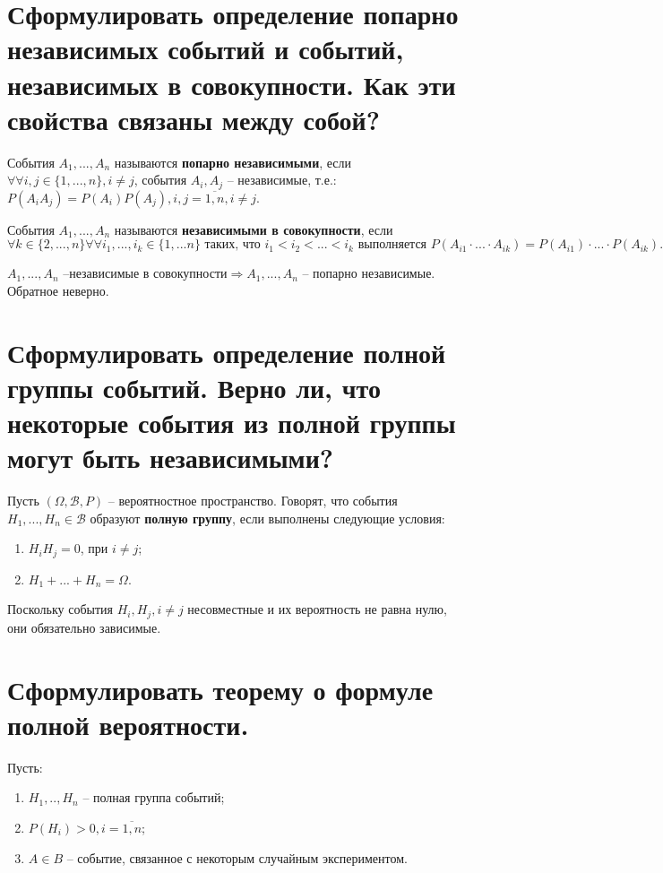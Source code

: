 \section{Сформулировать определение попарно независимых событий и событий, независимых в совокупности. Как эти свойства связаны между собой?}

События $A_1, ..., A_n$ называются \textbf{попарно независимыми}, если $\forall \forall i, j \in \{1, ..., n\}, i \neq j$, события $A_i, A_j$ -- независимые, т.е.: $P(A_iA_j) = P(A_i)P(A_j), i, j = \overline{1, n}, i \neq j.$

События $A_1, ..., A_n$ называются \textbf{независимыми в совокупности}, если $\forall k \in \{2, ..., n\} \forall \forall i_1, ..., i_k \in \{1, ... n\} \text{ таких, что } i_1 < i_2 < ... < i_k \text{ выполняется } P(A_{i1} \cdot ... \cdot A_{ik}) = P(A_{i1}) \cdot ... \cdot P(A_{ik}).$

$A_1, ..., A_n \text{ --независимые в совокупности} \Rightarrow A_1, ..., A_n \text{ -- попарно независимые}$. Обратное неверно.

\section{Сформулировать определение полной группы событий. Верно ли, что некоторые события из полной группы могут быть независимыми?}

Пусть $(\Omega, \mathcal{B}, P)$ -- вероятностное пространство. Говорят, что события $H_1, ..., H_n \in \mathcal{B}$ образуют \textbf{полную группу}, если выполнены следующие условия:
\begin{enumerate}
	\item $H_iH_j = 0$, при $i \neq j$;
	\item $H_1 + ... + H_n = \Omega$.
\end{enumerate}

Поскольку события $H_i, H_j, i \neq j$ несовместные и их вероятность не равна нулю, они обязательно зависимые.

\section{Сформулировать теорему о формуле полной вероятности.}

Пусть:
\begin{enumerate}
	\item $H_1, .., H_n$ -- полная группа событий;
	\item $P(H_i) > 0, i = \overline{1, n}$;
	\item $A \in B$ -- событие, связанное с некоторым случайным экспериментом.
\end{enumerate}

